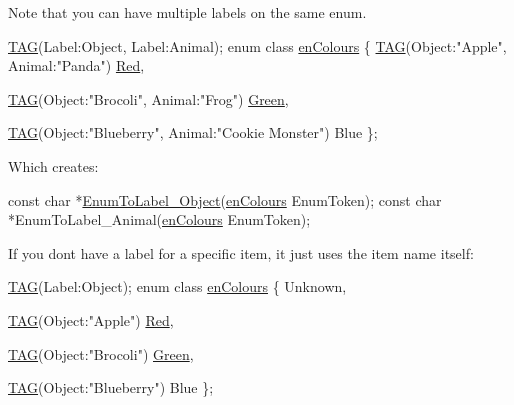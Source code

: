 Note that you can have multiple labels on the same enum.


\begin{DoxyCode}
\hyperlink{PreprocTest_8h_a2606cd56d2d8f567785bde5848176722}{TAG}(Label:Object, Label:Animal);
\textcolor{keyword}{enum class} \hyperlink{PreprocTest_8h_a081cf1a0e70d6e2bd48c98f457742877}{enColours}
\{
    \hyperlink{PreprocTest_8h_a2606cd56d2d8f567785bde5848176722}{TAG}(Object:\textcolor{stringliteral}{"Apple"}, Animal:\textcolor{stringliteral}{"Panda"})
    \hyperlink{PreprocTest_8h_a081cf1a0e70d6e2bd48c98f457742877aee38e4d5dd68c4e440825018d549cb47}{Red},

    \hyperlink{PreprocTest_8h_a2606cd56d2d8f567785bde5848176722}{TAG}(Object:\textcolor{stringliteral}{"Brocoli"}, Animal:\textcolor{stringliteral}{"Frog"})
    \hyperlink{PreprocTest_8h_a081cf1a0e70d6e2bd48c98f457742877ad382816a3cbeed082c9e216e7392eed1}{Green},

    \hyperlink{PreprocTest_8h_a2606cd56d2d8f567785bde5848176722}{TAG}(Object:\textcolor{stringliteral}{"Blueberry"}, Animal:\textcolor{stringliteral}{"Cookie Monster"})
    Blue
\};
\end{DoxyCode}


Which creates\+: 
\begin{DoxyCode}
\textcolor{keyword}{const} \textcolor{keywordtype}{char} *\hyperlink{Generated__Test_8h_a9b8638e967a81b3c211b77df49d85034}{EnumToLabel\_Object}(\hyperlink{PreprocTest_8h_a081cf1a0e70d6e2bd48c98f457742877}{enColours} EnumToken);
\textcolor{keyword}{const} \textcolor{keywordtype}{char} *EnumToLabel\_Animal(\hyperlink{PreprocTest_8h_a081cf1a0e70d6e2bd48c98f457742877}{enColours} EnumToken);
\end{DoxyCode}


If you don\textquotesingle{}t have a label for a specific item, it just uses the item name itself\+:


\begin{DoxyCode}
\hyperlink{PreprocTest_8h_a2606cd56d2d8f567785bde5848176722}{TAG}(Label:Object);
\textcolor{keyword}{enum class} \hyperlink{PreprocTest_8h_a081cf1a0e70d6e2bd48c98f457742877}{enColours}
\{
    Unknown, 

    \hyperlink{PreprocTest_8h_a2606cd56d2d8f567785bde5848176722}{TAG}(Object:\textcolor{stringliteral}{"Apple"})
    \hyperlink{PreprocTest_8h_a081cf1a0e70d6e2bd48c98f457742877aee38e4d5dd68c4e440825018d549cb47}{Red},

    \hyperlink{PreprocTest_8h_a2606cd56d2d8f567785bde5848176722}{TAG}(Object:\textcolor{stringliteral}{"Brocoli"})
    \hyperlink{PreprocTest_8h_a081cf1a0e70d6e2bd48c98f457742877ad382816a3cbeed082c9e216e7392eed1}{Green},

    \hyperlink{PreprocTest_8h_a2606cd56d2d8f567785bde5848176722}{TAG}(Object:\textcolor{stringliteral}{"Blueberry"})
    Blue
\};
\end{DoxyCode}


